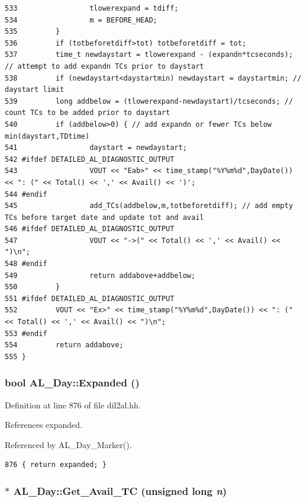 \begin{verbatim}
533                 tlowerexpand = tdiff;
534                 m = BEFORE_HEAD;
535         }
536         if (totbeforetdiff>tot) totbeforetdiff = tot;
537         time_t newdaystart = tlowerexpand - (expandn*tcseconds); // attempt to add expandn TCs prior to daystart
538         if (newdaystart<daystartmin) newdaystart = daystartmin; // daystart limit
539         long addbelow = (tlowerexpand-newdaystart)/tcseconds; // count TCs to be added prior to daystart
540         if (addbelow>0) { // add expandn or fewer TCs below min(daystart,TDtime)
541                 daystart = newdaystart;
542 #ifdef DETAILED_AL_DIAGNOSTIC_OUTPUT
543                 VOUT << "Eab>" << time_stamp("%Y%m%d",DayDate()) << ": (" << Total() << ',' << Avail() << ')';
544 #endif
545                 add_TCs(addbelow,m,totbeforetdiff); // add empty TCs before target date and update tot and avail
546 #ifdef DETAILED_AL_DIAGNOSTIC_OUTPUT
547                 VOUT << "->(" << Total() << ',' << Avail() << ")\n";
548 #endif
549                 return addabove+addbelow;
550         }
551 #ifdef DETAILED_AL_DIAGNOSTIC_OUTPUT
552         VOUT << "Ex>" << time_stamp("%Y%m%d",DayDate()) << ": (" << Total() << ',' << Avail() << ")\n";
553 #endif
554         return addabove;
555 }
\end{verbatim}\normalsize 
{}
\subsubsection{\setlength{\rightskip}{0pt plus 5cm}bool AL\_\-Day::Expanded ()\hspace{0.3cm}{\tt  [inline]}}\label{classAL__Day_a7}




Definition at line 876 of file dil2al.hh.

References expanded.

Referenced by AL\_\-Day\_\-Marker().



\footnotesize\begin{verbatim}876 { return expanded; }
\end{verbatim}\normalsize 
{}
\subsubsection{ $\ast$ AL\_\-Day::Get\_\-Avail\_\-TC (unsigned long {\em n})}\label{classAL__Day_a22}




